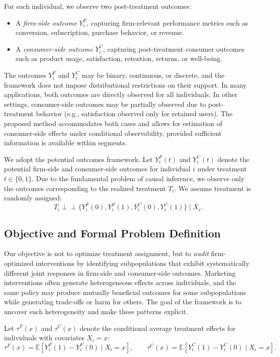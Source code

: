 \documentclass[11pt,letterpaper,english]{article}
\theoremstyle{definition}
\theoremstyle{definition}
\begin{document}
\begin{bibunit}
For each individual, we observe two post-treatment outcomes:
\begin{itemize}
    \item A \emph{firm-side outcome} $Y_i^F$, capturing firm-relevant performance metrics such as conversion, subscription, purchase behavior, or revenue.
    \item A \emph{consumer-side outcome} $Y_i^C$, capturing post-treatment consumer outcomes such as product usage, satisfaction, retention, returns, or well-being.
\end{itemize}

The outcomes $Y_i^F$ and $Y_i^C$ may be binary, continuous, or discrete, and the framework does not impose distributional restrictions on their support. In many applications, both outcomes are directly observed for all individuals. In other settings, consumer-side outcomes may be partially observed due to post-treatment behavior (e.g., satisfaction observed only for retained users). The proposed method accommodates both cases and allows for estimation of consumer-side effects under conditional observability, provided sufficient information is available within segments.

We adopt the potential outcomes framework. Let $Y_i^F(t)$ and $Y_i^C(t)$ denote the potential firm-side and consumer-side outcomes for individual $i$ under treatment $t \in \{0,1\}$. Due to the fundamental problem of causal inference, we observe only the outcomes corresponding to the realized treatment $T_i$. We assume treatment is randomly assigned:
\[
T_i \perp\!\!\!\perp \{Y_i^F(0), Y_i^F(1), Y_i^C(0), Y_i^C(1)\} \mid X_i.
\]

\subsection{Objective and Formal Problem Definition}
\label{ssec:setting}

Our objective is not to optimize treatment assignment, but to \emph{audit} firm-optimized interventions by identifying subpopulations that exhibit systematically different joint responses in firm-side and consumer-side outcomes. Marketing interventions often generate heterogeneous effects across individuals, and the same policy may produce mutually beneficial outcomes for some subpopulations while generating trade-offs or harm for others. The goal of the framework is to uncover such heterogeneity and make these patterns explicit.

Let $\tau^F(x)$ and $\tau^C(x)$ denote the conditional average treatment effects for individuals with covariates $X_i = x$:
\[
\tau^F(x) = \mathbb{E}[Y_i^F(1) - Y_i^F(0) \mid X_i = x], \qquad
\tau^C(x) = \mathbb{E}[Y_i^C(1) - Y_i^C(0) \mid X_i = x].
\]


\end{bibunit}
\end{document}
